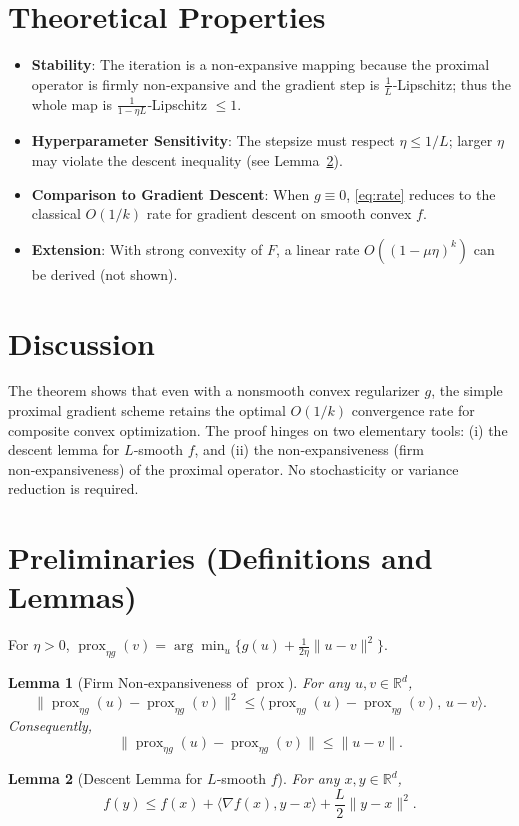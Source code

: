 \documentclass{article}
\newtheorem{lemma}{Lemma}
\newcommand{\prox}{\operatorname{prox}}
\begin{document}
\section*{Theoretical Properties}
\begin{itemize}
  \item \textbf{Stability}: The iteration is a non‑expansive mapping because the proximal operator is firmly non‑expansive and the gradient step is $\frac{1}{L}$‑Lipschitz; thus the whole map is $\frac{1}{1-\eta L}$‑Lipschitz $\le1$.
  \item \textbf{Hyperparameter Sensitivity}: The stepsize must respect $\eta\le1/L$; larger $\eta$ may violate the descent inequality (see Lemma~\ref{lem:descent}).
  \item \textbf{Comparison to Gradient Descent}: When $g\equiv0$, \eqref{eq:rate} reduces to the classical $O(1/k)$ rate for gradient descent on smooth convex $f$.
  \item \textbf{Extension}: With strong convexity of $F$, a linear rate $O((1-\mu\eta)^{k})$ can be derived (not shown).
\end{itemize}

\section*{Discussion}
The theorem shows that even with a nonsmooth convex regularizer $g$, the simple proximal gradient scheme retains the optimal $O(1/k)$ convergence rate for composite convex optimization. The proof hinges on two elementary tools: (i) the descent lemma for $L$‑smooth $f$, and (ii) the non‑expansiveness (firm non‑expansiveness) of the proximal operator. No stochasticity or variance reduction is required.

\newpage

\section*{Preliminaries (Definitions and Lemmas)}
\begin{definition}
For $\eta>0$, $\prox_{\eta g}(v)=\arg\min_{u}\bigl\{g(u)+\frac{1}{2\eta}\|u-v\|^{2}\bigr\}$.
\end{definition}
\begin{lemma}[Firm Non‑expansiveness of $\prox$]
\label{lem:firm}
For any $u,v\in\mathbb{R}^{d}$,
\[
\|\prox_{\eta g}(u)-\prox_{\eta g}(v)\|^{2}
\le\langle \prox_{\eta g}(u)-\prox_{\eta g}(v),\,u-v\rangle .
\]
Consequently,
\[
\|\prox_{\eta g}(u)-\prox_{\eta g}(v)\|\le\|u-v\|.
\]
\end{lemma}
\begin{lemma}[Descent Lemma for $L$‑smooth $f$]
\label{lem:descent}
For any $x,y\in\mathbb{R}^{d}$,
\[
f(y)\le f(x)+\langle\nabla f(x),y-x\rangle+\frac{L}{2}\|y-x\|^{2}.
\]
\end{lemma}
\end{document}
